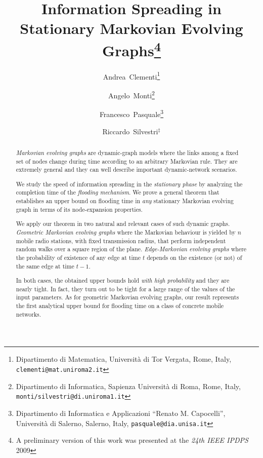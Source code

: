 \documentclass[10pt,a4paper]{article}
\begin{document}
\title{\bf{Information Spreading in \\ Stationary Markovian Evolving Graphs}\thanks{A preliminary version of this work was presented at the \emph{24th IEEE IPDPS} 2009}}
\author{Andrea~Clementi\thanks{Dipartimento di Matematica, Universit\`a di  Tor Vergata, Rome, Italy, \texttt{clementi@mat.uniroma2.it}}
\and
Angelo~Monti\thanks{Dipartimento di Informatica, Sapienza Universit\`a di Roma, Rome, Italy, \texttt{monti/silvestri@di.uniroma1.it}}
\and
Francesco~Pasquale\thanks{Dipartimento di Informatica e Applicazioni ``Renato M. Capocelli'', Universit\`a di Salerno, Salerno, Italy, \texttt{pasquale@dia.unisa.it}}
\and
Riccardo~Silvestri$^\ddagger$}
\date{}


\maketitle




\begin{abstract}
\emph{Markovian evolving graphs}  are dynamic-graph models where the links among a fixed set of nodes change during time according to an arbitrary Markovian rule. They are extremely general and they can well describe important dynamic-network scenarios.

We study the speed of information spreading in the \emph{stationary phase} by analyzing the completion time of the \emph{flooding mechanism}. We prove a general theorem that establishes an upper bound on flooding time in \emph{any} stationary Markovian evolving graph in terms of its node-expansion properties.

We apply our theorem in two natural and relevant cases of such dynamic graphs. \emph{Geometric Markovian evolving graphs}  where the Markovian behaviour is yielded by $n$ mobile radio stations, with fixed transmission radius, that perform   independent random walks over a square region of the plane.  \emph{Edge-Markovian evolving graphs}  where the probability of existence of any edge at time $t$ depends on the existence (or not) of the same edge at time $t-1$.

In both cases, the obtained upper bounds hold \emph{with high probability} and they are nearly tight. In fact, they turn out to be tight for a large range of the values of the input parameters. As for geometric Markovian evolving graphs, our result represents the first analytical upper  bound for flooding time on a class of concrete mobile networks.

\end{abstract}
\end{document}
